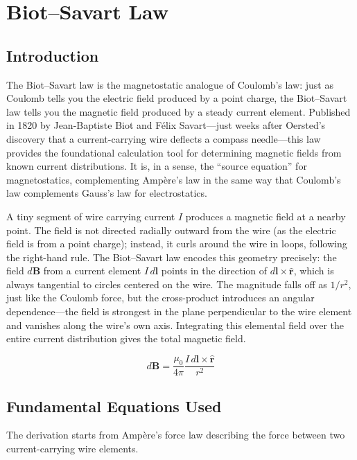 \chapter{Biot--Savart Law}

\section*{Introduction}

The Biot--Savart law is the magnetostatic analogue of Coulomb's law: just as Coulomb tells you the electric field produced by a point charge, the Biot--Savart law tells you the magnetic field produced by a steady current element. Published in 1820 by Jean-Baptiste Biot and Félix Savart---just weeks after Oersted's discovery that a current-carrying wire deflects a compass needle---this law provides the foundational calculation tool for determining magnetic fields from known current distributions. It is, in a sense, the ``source equation'' for magnetostatics, complementing Ampère's law in the same way that Coulomb's law complements Gauss's law for electrostatics.

A tiny segment of wire carrying current $I$ produces a magnetic field at a nearby point. The field is not directed radially outward from the wire (as the electric field is from a point charge); instead, it curls around the wire in loops, following the right-hand rule. The Biot--Savart law encodes this geometry precisely: the field $d\mathbf{B}$ from a current element $I\,d\mathbf{l}$ points in the direction of $d\mathbf{l}\times\hat{\mathbf{r}}$, which is always tangential to circles centered on the wire. The magnitude falls off as $1/r^2$, just like the Coulomb force, but the cross-product introduces an angular dependence---the field is strongest in the plane perpendicular to the wire element and vanishes along the wire's own axis. Integrating this elemental field over the entire current distribution gives the total magnetic field.


\begin{equation}
d\mathbf{B} = \frac{\mu_0}{4\pi}\frac{I\,d\mathbf{l}\times\hat{\mathbf{r}}}{r^2}
\end{equation}

\section*{Fundamental Equations Used}

The derivation starts from Ampère's force law describing the force between two current-carrying wire elements.


